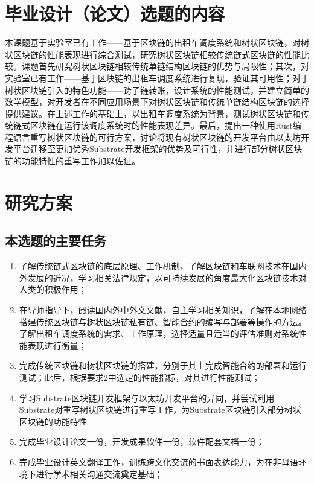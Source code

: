 \documentclass[type=undergraduate_proposal]{bitreport}
\begin{document}
\MakeCover

\MakeReviewTable

\section{毕业设计（论文）选题的内容}
本课题基于实验室已有工作——基于区块链的出租车调度系统和树状区块链，对树状区块链的性能表现进行综合测试，研究树状区块链相较传统链式区块链的性能比较。课题首先研究树状区块链相较传统单链结构区块链的优势与局限性；其次，对实验室已有工作——基于区块链的出租车调度系统进行复现，验证其可用性；对于树状区块链引入的特色功能——跨子链转账，设计系统的性能测试，并建立简单的数学模型，对开发者在不同应用场景下对树状区块链和传统单链结构区块链的选择提供建议。在上述工作的基础上，以出租车调度系统为背景，测试树状区块链和传统链式区块链在运行该调度系统时的性能表现差异。最后，提出一种使用Rust编程语言重写树状区块链的可行方案，讨论将现有树状区块链的开发平台由以太坊开发平台迁移至更加优秀Substrate开发框架的优势及可行性，并进行部分树状区块链的功能特性的重写工作加以佐证。

\section{研究方案}
\subsection{本选题的主要任务}
\begin{enumerate}
  \item 了解传统链式区块链的底层原理、工作机制，了解区块链和车联网技术在国内外发展的近况\cite{blockchainCurrent}\cite{iov}，学习相关法律规定，以可持续发展的角度最大化区块链技术对人类的积极作用；
  \item 在导师指导下，阅读国内外中外文文献，自主学习相关知识，了解在本地网络搭建传统区块链与树状区块链私有链、智能合约的编写与部署等操作的方法。了解出租车调度系统的需求、工作原理，选择适量且适当的评估准则对系统性能表现进行衡量；
  \item 完成传统区块链和树状区块链的搭建，分别于其上完成智能合约的部署和运行测试；此后，根据要求2中选定的性能指标，对其进行性能测试；
  \item 学习Substrate区块链开发框架与以太坊开发平台的异同，并尝试利用Substrate对重写树状区块链进行重写工作，为Substrate区块链引入部分树状区块链的功能特性
  \item 完成毕业设计论文一份，开发成果软件一份，软件配套文档一份；
  \item 完成毕业设计英文翻译工作，训练跨文化交流的书面表达能力，为在非母语环境下进行学术相关沟通交流奠定基础；
\end{enumerate}
\end{document}
